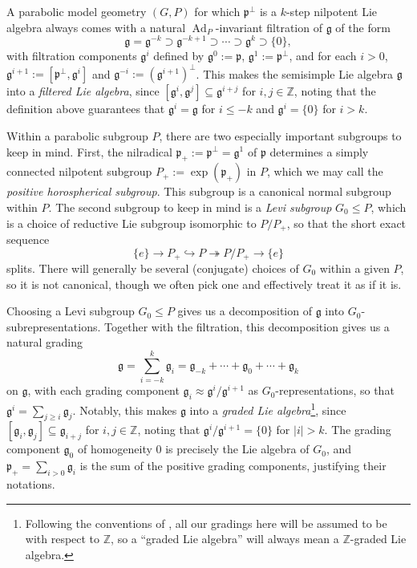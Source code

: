 \documentclass[12pt,a4paper]{amsart}
\theoremstyle{definition}
\DeclareMathOperator{\Ad}{Ad}
\begin{document}
A parabolic model geometry $(G,P)$ for which $\mathfrak{p}^\perp$ is a $k$-step nilpotent Lie algebra always comes with a natural $\Ad_P$-invariant filtration of $\mathfrak{g}$ of the form
\[\mathfrak{g}=\mathfrak{g}^{-k}\supset\mathfrak{g}^{-k+1}\supset\cdots\supset\mathfrak{g}^k\supset\{0\},\]
with filtration components $\mathfrak{g}^i$ defined by $\mathfrak{g}^0:=\mathfrak{p}$, $\mathfrak{g}^1:=\mathfrak{p}^\perp$, and for each $i>0$, $\mathfrak{g}^{i+1}:=[\mathfrak{p}^\perp,\mathfrak{g}^i]$ and $\mathfrak{g}^{-i}:=(\mathfrak{g}^{i+1})^\perp$. This makes the semisimple Lie algebra $\mathfrak{g}$ into a \emph{filtered Lie algebra}, since $[\mathfrak{g}^i,\mathfrak{g}^j]\subseteq\mathfrak{g}^{i+j}$ for $i,j\in\mathbb{Z}$, noting that the definition above guarantees that $\mathfrak{g}^i=\mathfrak{g}$ for $i\leq -k$ and $\mathfrak{g}^i=\{0\}$ for $i>k$.

Within a parabolic subgroup $P$, there are two especially important subgroups to keep in mind. First, the nilradical $\mathfrak{p}_+:=\mathfrak{p}^\perp=\mathfrak{g}^1$ of $\mathfrak{p}$ determines a simply connected nilpotent subgroup $P_+:=\exp(\mathfrak{p}_+)$ in $P$, which we may call the \emph{positive horospherical subgroup}. This subgroup is a canonical normal subgroup within $P$. The second subgroup to keep in mind is a \emph{Levi subgroup} $G_0\leq P$, which is a choice of reductive Lie subgroup isomorphic to $P/P_+$, so that the short exact sequence \[\{e\}\to P_+\hookrightarrow P\twoheadrightarrow P/P_+\to\{e\}\] splits. There will generally be several (conjugate) choices of $G_0$ within a given $P$, so it is not canonical, though we often pick one and effectively treat it as if it is.

Choosing a Levi subgroup $G_0\leq P$ gives us a decomposition of $\mathfrak{g}$ into $G_0$-subrepresentations. Together with the filtration, this decomposition gives us a natural grading
\[\mathfrak{g}=\sum_{i=-k}^k\mathfrak{g}_i=\mathfrak{g}_{-k}+\cdots+\mathfrak{g}_0+\cdots+\mathfrak{g}_k\]
on $\mathfrak{g}$, with each grading component $\mathfrak{g}_i\approx\mathfrak{g}^i/\mathfrak{g}^{i+1}$ as $G_0$-representations, so that $\mathfrak{g}^i=\sum_{j\geq i}\mathfrak{g}_j$. Notably, this makes $\mathfrak{g}$ into a \emph{graded Lie algebra}\footnote{Following the conventions of \cite{CapSlovakPG1}, all our gradings here will be assumed to be with respect to $\mathbb{Z}$, so a ``graded Lie algebra'' will always mean a $\mathbb{Z}$-graded Lie algebra.}, since $[\mathfrak{g}_i,\mathfrak{g}_j]\subseteq\mathfrak{g}_{i+j}$ for $i,j\in\mathbb{Z}$, noting that $\mathfrak{g}^i/\mathfrak{g}^{i+1}=\{0\}$ for $|i|>k$. The grading component $\mathfrak{g}_0$ of homogeneity 0 is precisely the Lie algebra of $G_0$, and $\mathfrak{p}_+=\sum_{i>0}\mathfrak{g}_i$ is the sum of the positive grading components, justifying their notations.
\end{document}
